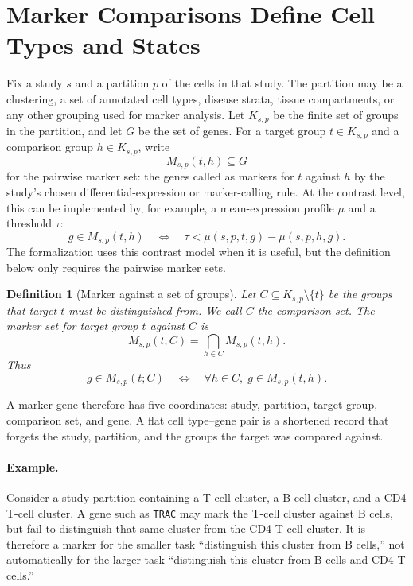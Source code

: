 \documentclass{article}
\newtheorem{definition}{Definition}
\begin{document}
\section{Marker Comparisons Define Cell Types and States}

Fix a study $s$ and a partition $p$ of the cells in that study. The partition may be a clustering, a set of annotated cell types, disease strata, tissue compartments, or any other grouping used for marker analysis. Let $K_{s,p}$ be the finite set of groups in the partition, and let $G$ be the set of genes. For a target group $t\in K_{s,p}$ and a comparison group $h\in K_{s,p}$, write
\[
  M_{s,p}(t,h)\subseteq G
\]
for the pairwise marker set: the genes called as markers for $t$ against $h$ by the study's chosen differential-expression or marker-calling rule. At the contrast level, this can be implemented by, for example, a mean-expression profile $\mu$ and a threshold $\tau$:
\[
  g\in M_{s,p}(t,h)
  \quad\Longleftrightarrow\quad
  \tau < \mu(s,p,t,g)-\mu(s,p,h,g).
\]
The formalization uses this contrast model when it is useful, but the definition below only requires the pairwise marker sets.

\begin{definition}[Marker against a set of groups]\label{def:comparison-family-marker}
Let $C\subseteq K_{s,p}\setminus\{t\}$ be the groups that target $t$ must be distinguished from. We call $C$ the comparison set. The marker set for target group $t$ against $C$ is
\[
  M_{s,p}(t;C)=\bigcap_{h\in C}M_{s,p}(t,h).
\]
Thus
\[
  g\in M_{s,p}(t;C)
  \quad\Longleftrightarrow\quad
  \forall h\in C,\; g\in M_{s,p}(t,h).
\]
\end{definition}

A marker gene therefore has five coordinates: study, partition, target group, comparison set, and gene. A flat cell type--gene pair is a shortened record that forgets the study, partition, and the groups the target was compared against.

\paragraph{Example.}
Consider a study partition containing a T-cell cluster, a B-cell cluster, and a CD4 T-cell cluster. A gene such as \texttt{TRAC} may mark the T-cell cluster against B cells, but fail to distinguish that same cluster from the CD4 T-cell cluster. It is therefore a marker for the smaller task ``distinguish this cluster from B cells,'' not automatically for the larger task ``distinguish this cluster from B cells and CD4 T cells.''
\end{document}
